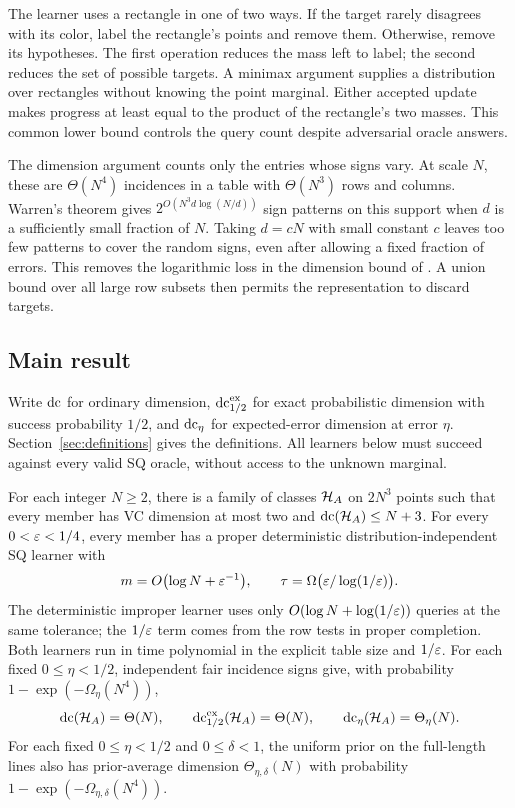 The learner uses a rectangle in one of two ways. If the target rarely disagrees with its color, label the rectangle's points and remove them. Otherwise, remove its hypotheses. The first operation reduces the mass left to label; the second reduces the set of possible targets. A minimax argument supplies a distribution over rectangles without knowing the point marginal. Either accepted update makes progress at least equal to the product of the rectangle's two masses. This common lower bound controls the query count despite adversarial oracle answers.

The dimension argument counts only the entries whose signs vary. At scale $N$, these are $\Theta(N^4)$ incidences in a table with $\Theta(N^3)$ rows and columns. Warren's theorem gives $2^{O(N^3d\log(N/d))}$ sign patterns on this support when $d$ is a sufficiently small fraction of $N$. Taking $d=cN$ with small constant $c$ leaves too few patterns to cover the random signs, even after allowing a fixed fraction of errors. This removes the logarithmic loss in the dimension bound of \citet{HHPTZ22}. A union bound over all large row subsets then permits the representation to discard targets.

\subsection{Main result}\label{sec:main}
Write $\operatorname{dc}$ for ordinary dimension, $\operatorname{dc}^{\mathrm{ex}}_{1/2}$ for exact probabilistic dimension with success probability $1/2$, and $\operatorname{dc}_\eta$ for expected-error dimension at error $\eta$. Section~\ref{sec:definitions} gives the definitions. All learners below must succeed against every valid SQ oracle, without access to the unknown marginal.

\begin{theorem}\label{thm:main}
For each integer $N\ge2$, there is a family of classes $\mathcal H_A$ on $2N^3$ points such that every member has VC dimension at most two and $\operatorname{dc}(\mathcal H_A)\le N+3$. For every $0<\varepsilon<1/4$, every member has a proper deterministic distribution-independent SQ learner with
\begin{equation}
 m=O\bigl(\log N+\varepsilon^{-1}\bigr),
 \qquad \tau=\Omega\bigl(\varepsilon/\log(1/\varepsilon)\bigr).
 \label{eq:mainlearn}
\end{equation}
The deterministic improper learner uses only $O(\log N+\log(1/\varepsilon))$ queries at the same tolerance; the $1/\varepsilon$ term comes from the row tests in proper completion. Both learners run in time polynomial in the explicit table size and $1/\varepsilon$. For each fixed $0\le\eta<1/2$, independent fair incidence signs give, with probability $1-\exp(-\Omega_\eta(N^4))$,
\begin{equation}
 \operatorname{dc}(\mathcal H_A)=\Theta(N),\qquad
 \operatorname{dc}^{\mathrm{ex}}_{1/2}(\mathcal H_A)=\Theta(N),\qquad
 \operatorname{dc}_\eta(\mathcal H_A)=\Theta_\eta(N).
 \label{eq:maindim}
\end{equation}
For each fixed $0\le\eta<1/2$ and $0\le\delta<1$, the uniform prior on the full-length lines also has prior-average dimension $\Theta_{\eta,\delta}(N)$ with probability $1-\exp(-\Omega_{\eta,\delta}(N^4))$.
\end{theorem}


